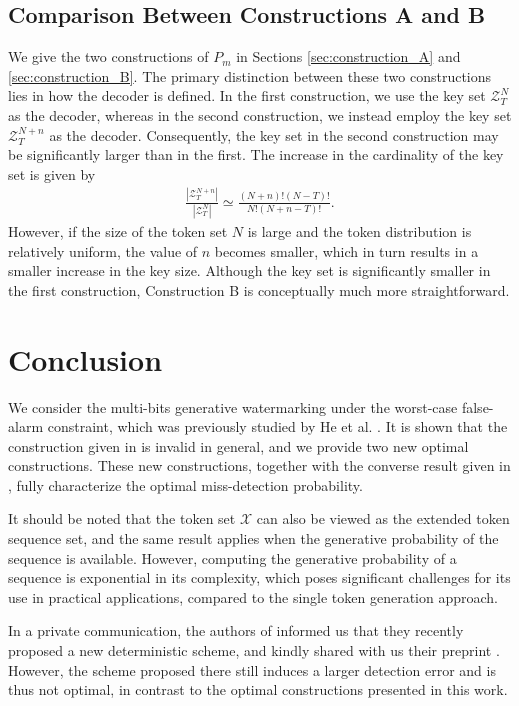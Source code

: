 \documentclass[11pt,letterpaper]{article}
\newcommand{\cX}{\mathcal{X}}
\newcommand{\cZ}{\mathcal{Z}}
\begin{document}
 

\subsection{Comparison Between Constructions A and B}
We give the two constructions of $P_m$ in Sections \ref{sec:construction_A} and \ref{sec:construction_B}. The primary distinction between these two constructions lies in how the decoder is defined. In the first construction, we use the key set $\cZ^N_T$ as the decoder, whereas in the second construction, we instead employ the key set $\cZ^{N+n}_T$ as the decoder. Consequently, the key set in the second construction may be significantly larger than in the first. The increase in the cardinality of the key set is given by
\begin{align}
    \frac{|\cZ^{N+n}_T|}{|\cZ^{N}_T|} \simeq \frac{(N+n)!(N-T)!}{N!(N+n-T)!}. 
\end{align}
However, if the size of the token set $N$ is large and the token distribution is relatively uniform, the value of $n$ becomes smaller, which in turn results in a smaller increase in the key size. Although the key set is significantly smaller in the first construction, Construction B is conceptually much more straightforward. 

\section{Conclusion}
We consider the multi-bits generative watermarking under the worst-case false-alarm constraint, which was previously studied by  He et al. \cite{hedistributional}. It is shown that the construction given in \cite{hedistributional} is invalid in general, and we provide two new optimal constructions. These new constructions, together with the converse result given in  \cite{hedistributional}, fully characterize the optimal miss-detection probability. 

It should be noted that the token set $\cX$ can also be viewed as the extended token sequence set, and the same result applies when the generative probability of the sequence is available. However, computing the generative probability of a sequence is exponential in its complexity, which poses significant challenges for its use in practical applications, compared to the single token generation approach. 

In a private communication, the authors of \cite{he2024theoretically,hedistributional} informed us that they recently proposed a new deterministic scheme, and kindly shared with us their preprint  \cite{he2026fundamental}. However, the scheme proposed there still induces a larger detection error and is thus not optimal, in contrast to the optimal constructions presented in this work. 
\end{document}
